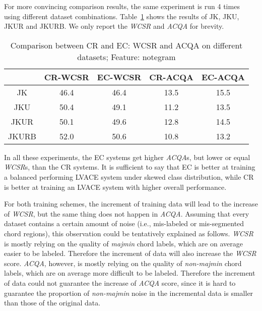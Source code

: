 For more convincing comparison results, the same experiment is run 4 times using different dataset combinations. Table~\ref{tab:4-datasize-ns} shows the results of JK, JKU, JKUR and JKURB. We only report the \textit{WCSR} and \textit{ACQA} for brevity.
\begin{table}[htb]
	\centering
	\scriptsize
	\begin{tabular}{|c|c|c|c|c|} \hline
		& CR-WCSR & EC-WCSR & CR-ACQA & EC-ACQA \\ \hline
		JK & 46.4 & 46.4 & 13.5 & 15.5 \\ \hline
		JKU & 50.4 & 49.1 & 11.2 & 13.5 \\ \hline
		JKUR & 50.1 & 49.6 & 12.8 & 14.5 \\ \hline
		JKURB & 52.0 & 50.6 & 10.8 & 13.2 \\ \hline
	\end{tabular}
	\caption{Comparison between CR and EC: WCSR and ACQA on different datasets; Feature: notegram}
	\label{tab:4-datasize-ns}
\end{table}

In all these experiments, the EC systems get higher \textit{ACQA}s, but lower or equal \textit{WCSR}s, than the CR systems. It is sufficient to say that EC is better at training a balanced performing LVACE system under skewed class distribution, while CR is better at training an LVACE system with higher overall performance.

For both training schemes, the increment of training data will lead to the increase of \textit{WCSR}, but the same thing does not happen in \textit{ACQA}. Assuming that every dataset contains a certain amount of noise (i.e., mis-labeled or mis-segmented chord regions), this observation could be tentatively explained as follows. \textit{WCSR} is mostly relying on the quality of \textit{majmin} chord labels, which are on average easier to be labeled. Therefore the increment of data will also increase the \textit{WCSR} score. \textit{ACQA}, however, is mostly relying on the quality of \textit{non-majmin} chord labels, which are on average more difficult to be labeled. Therefore the increment of data could not guarantee the increase of \textit{ACQA} score, since it is hard to guarantee the proportion of \textit{non-majmin} noise in the incremental data is smaller than those of the original data.

